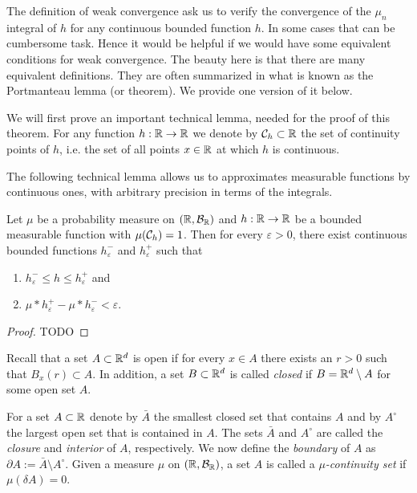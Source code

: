 The definition of weak convergence ask us to verify the convergence of the $\mu_n$ integral of $h$ for any continuous bounded function $h$. In some cases that can be cumbersome task. Hence it would be helpful if we would have some equivalent conditions for weak convergence. The beauty here is that there are many equivalent definitions. They are often summarized in what is known as the Portmanteau lemma (or theorem). We provide one version of it below.

We will first prove an important technical lemma, needed for the proof of this theorem. For any function $h : \mathbb R \to \mathbb R$ we denote by $\mathcal C_h \subset \mathbb R$ the set of continuity points of $h$, i.e. the set of all points $x\in \mathbb R$ at which $h$ is continuous. 

The following technical lemma allows us to approximates measurable functions by continuous ones, with arbitrary precision in terms of the integrals.

\begin{lemma}
Let $\mu$ be a probability measure on $(\mathbb R, \mathcal B_{\mathbb R})$ and $h : \mathbb R \to \mathbb R$ be a bounded measurable function with $\mu(\mathcal C_h) = 1$. Then for every $\varepsilon > 0$, there exist continuous bounded functions $h^-_\varepsilon$ and $h^+_\varepsilon$ such that
\begin{enumerate}
\item $h^-_\varepsilon \le h \le h^+_\varepsilon$ and
\item $\mu \ast h^+_\varepsilon - \mu \ast h^-_\varepsilon < \varepsilon$.
\end{enumerate} 
\end{lemma}

\begin{proof}
TODO
\end{proof}

Recall that a set $A \subset \mathbb R^d$ is open if for every $x \in A$ there exists an $r > 0$ such that $B_x(r) \subset A$. In addition, a set $B\subset \mathbb R^d$ is called \emph{closed} if $B = \mathbb R^d \setminus A$ for some open set $A$.

For a set $A \subset \mathbb R$ denote by $\bar{A}$ the smallest closed set that contains $A$ and by $A^\circ$ the largest open set that is contained in $A$. The sets $\bar{A}$ and $A^\circ$ are called the \emph{closure} and \emph{interior} of $A$, respectively. We now define the \emph{boundary} of $A$ as $\partial A := \bar{A} \setminus A^\circ$. Given a measure $\mu$ on $(\mathbb R, \mathcal B_{\mathbb R})$, a set $A$ is called a \emph{$\mu$-continuity set} if $\mu(\delta A) = 0$.

